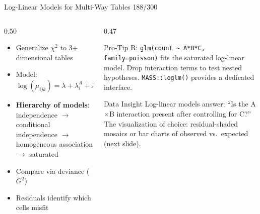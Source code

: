 \documentclass[10pt]{beamer}
\newcommand{\smark}[1]{\hfill{\scriptsize\color{codegray}#1}}
\begin{document}
\begin{frame}{Log-Linear Models for Multi-Way Tables}
\smark{188/300}
\begin{columns}[T]
\begin{column}{0.50\textwidth}
\begin{itemize}
    \item Generalize $\chi^2$ to 3+ dimensional tables
    \item Model: $\log(\mu_{ijk}) = \lambda + \lambda_i^A + \lambda_j^B + \lambda_k^C + \lambda_{ij}^{AB} + \ldots$
    \item \textbf{Hierarchy of models}: independence $\to$ conditional independence $\to$ homogeneous association $\to$ saturated
    \item Compare via deviance ($G^2$)
    \item Residuals identify which cells misfit
\end{itemize}
\end{column}
\begin{column}{0.47\textwidth}
\begin{alertblock}{Pro-Tip}
    \scriptsize R: \texttt{glm(count \textasciitilde\ A*B*C, family=poisson)} fits the saturated log-linear model. Drop interaction terms to test nested hypotheses. \texttt{MASS::loglm()} provides a dedicated interface.
\end{alertblock}
\vspace{0.1cm}
\begin{exampleblock}{Data Insight}
    \scriptsize Log-linear models answer: ``Is the A$\times$B interaction present after controlling for C?'' The visualization of choice: residual-shaded mosaics or bar charts of observed vs.\ expected (next slide).
\end{exampleblock}
\end{column}
\end{columns}
\end{frame}
\end{document}
